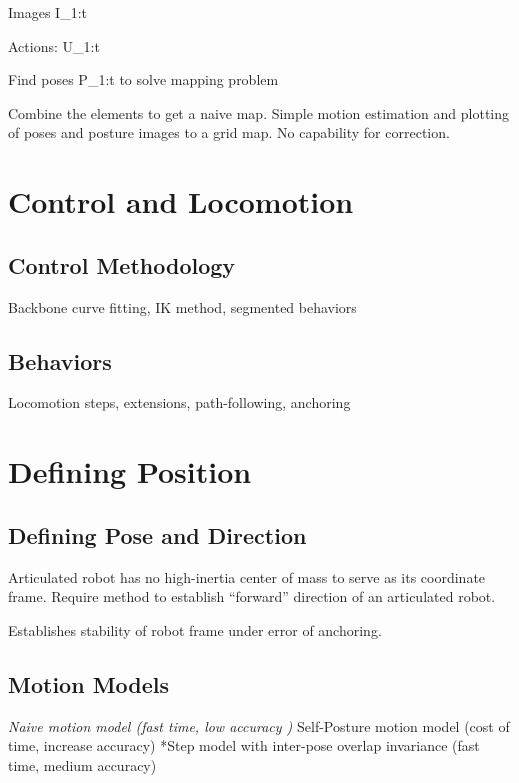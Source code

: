 Images I\_1:t

Actions: U\_1:t

Find poses P\_1:t to solve mapping problem

Combine the elements to get a naive map. Simple motion estimation and plotting of poses and posture images to a grid map. No capability for correction.

\pagebreak 

\chapter{Control and Locomotion}
\label{controlandlocomotion}

\section{Control Methodology}
\label{controlmethodology}

Backbone curve fitting, IK method, segmented behaviors

\section{Behaviors}
\label{behaviors}

Locomotion steps, extensions, path-following, anchoring

\pagebreak 

\chapter{Defining Position}
\label{definingposition}

\section{Defining Pose and Direction}
\label{definingposeanddirection}

Articulated robot has no high-inertia center of mass to serve as its coordinate frame. Require method to establish “forward” direction of an articulated robot.

Establishes stability of robot frame under error of anchoring.

\section{Motion Models}
\label{motionmodels}

\emph{Naive motion model (fast time, low accuracy )
}Self-Posture motion model (cost of time, increase accuracy)
*Step model with inter-pose overlap invariance (fast time, medium accuracy)


